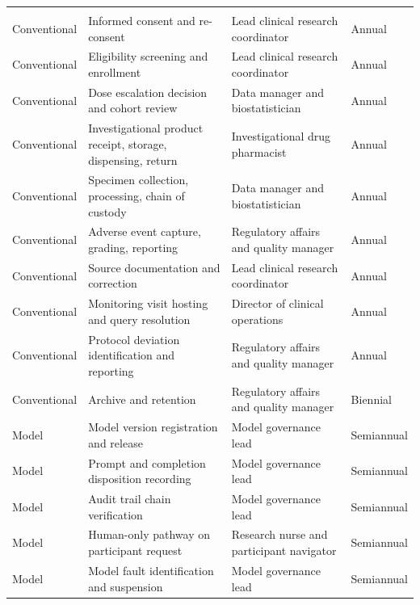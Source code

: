 \begin{mvltable}
\begin{xltabular}{\textwidth}{>{\raggedright\arraybackslash}p{2.2cm} >{\raggedright\arraybackslash}p{4.4cm} >{\raggedright\arraybackslash}p{2.4cm} >{\raggedright\arraybackslash}X}
\headrow {} &  &  & \\
\midrule
\endfirsthead
\headrow {} &  &  & \\
\midrule
\endhead
Conventional & Informed consent and re-consent & Lead clinical research coordinator & Annual \\
Conventional & Eligibility screening and enrollment & Lead clinical research coordinator & Annual \\
Conventional & Dose escalation decision and cohort review & Data manager and biostatistician & Annual \\
Conventional & Investigational product receipt, storage, dispensing, return & Investigational drug pharmacist & Annual \\
Conventional & Specimen collection, processing, chain of custody & Data manager and biostatistician & Annual \\
Conventional & Adverse event capture, grading, reporting & Regulatory affairs and quality manager & Annual \\
Conventional & Source documentation and correction & Lead clinical research coordinator & Annual \\
Conventional & Monitoring visit hosting and query resolution & Director of clinical operations & Annual \\
Conventional & Protocol deviation identification and reporting & Regulatory affairs and quality manager & Annual \\
Conventional & Archive and retention & Regulatory affairs and quality manager & Biennial \\
Model & Model version registration and release & Model governance lead & Semiannual \\
Model & Prompt and completion disposition recording & Model governance lead & Semiannual \\
Model & Audit trail chain verification & Model governance lead & Semiannual \\
Model & Human-only pathway on participant request & Research nurse and participant navigator & Semiannual \\
Model & Model fault identification and suspension & Model governance lead & Semiannual \\

\end{xltabular}
\end{mvltable}
